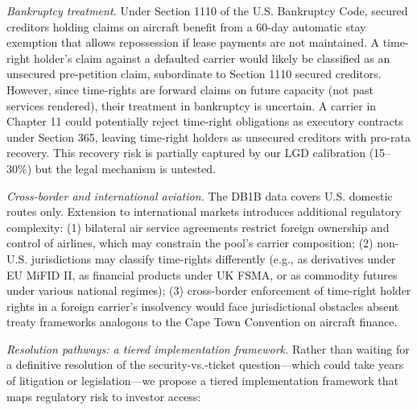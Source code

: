\documentclass[12pt,a4paper]{article}
\begin{document}
\textit{Bankruptcy treatment.} Under Section 1110 of the U.S. Bankruptcy Code, secured creditors holding claims on aircraft benefit from a 60-day automatic stay exemption that allows repossession if lease payments are not maintained. A time-right holder's claim against a defaulted carrier would likely be classified as an unsecured pre-petition claim, subordinate to Section 1110 secured creditors. However, since time-rights are forward claims on future capacity (not past services rendered), their treatment in bankruptcy is uncertain. A carrier in Chapter 11 could potentially reject time-right obligations as executory contracts under Section 365, leaving time-right holders as unsecured creditors with pro-rata recovery. This recovery risk is partially captured by our LGD calibration (15--30\%) but the legal mechanism is untested.

\textit{Cross-border and international aviation.} The DB1B data covers U.S. domestic routes only. Extension to international markets introduces additional regulatory complexity: (1) bilateral air service agreements restrict foreign ownership and control of airlines, which may constrain the pool's carrier composition; (2) non-U.S. jurisdictions may classify time-rights differently (e.g., as derivatives under EU MiFID II, as financial products under UK FSMA, or as commodity futures under various national regimes); (3) cross-border enforcement of time-right holder rights in a foreign carrier's insolvency would face jurisdictional obstacles absent treaty frameworks analogous to the Cape Town Convention on aircraft finance.

\textit{Resolution pathways: a tiered implementation framework.} Rather than waiting for a definitive resolution of the security-vs.-ticket question---which could take years of litigation or legislation---we propose a tiered implementation framework that maps regulatory risk to investor access:
\end{document}
